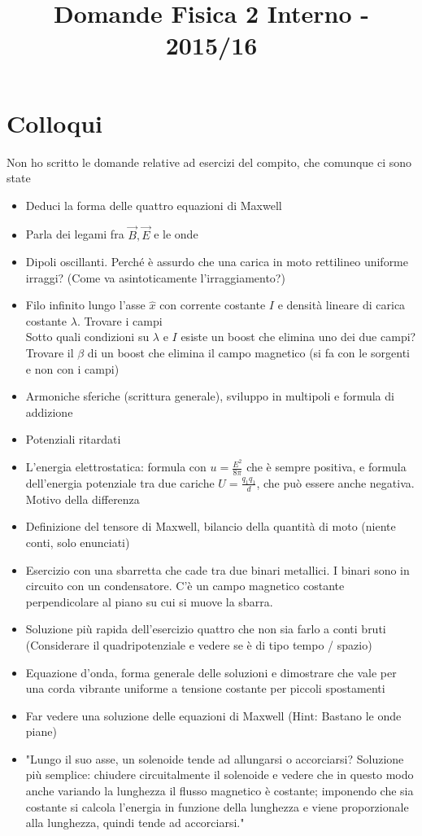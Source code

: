 \documentclass[a4paper,NoNotes,GeneralMath]{stdmdoc}
\begin{document}
	\title{Domande Fisica 2 Interno - 2015/16}
	
	\section*{Colloqui}
	Non ho scritto le domande relative ad esercizi del compito, che comunque ci sono state
	\begin{itemize}
		\item Deduci la forma delle quattro equazioni di Maxwell
		\item Parla dei legami fra $\vec{B}, \vec{E}$ e le onde
		\item Dipoli oscillanti. Perché è assurdo che una carica in moto rettilineo uniforme irraggi? (Come va asintoticamente l'irraggiamento?)
		\item Filo infinito lungo l'asse $\hat{x}$ con corrente costante $I$ e densità lineare di carica costante $\lambda$. Trovare i campi \\
			Sotto quali condizioni su $\lambda$ e $I$ esiste un boost che elimina uno dei due campi? Trovare il $\beta$ di un boost che elimina il campo magnetico (si fa con le sorgenti e non con i campi)
		\item Armoniche sferiche (scrittura generale), sviluppo in multipoli e formula di addizione
		\item Potenziali ritardati
		\item L'energia elettrostatica: formula con $u = \frac{E^2}{8\pi }$ che è sempre positiva, e formula dell'energia potenziale tra due cariche $U = \frac{q_1 q_1}{d}$, che può essere anche negativa. Motivo della differenza
		\item Definizione del tensore di Maxwell, bilancio della quantità di moto (niente conti, solo enunciati)
		\item Esercizio con una sbarretta che cade tra due binari metallici. I binari sono in circuito con un condensatore. C'è un campo magnetico costante perpendicolare al piano su cui si muove la sbarra.
		\item Soluzione più rapida dell'esercizio quattro che non sia farlo a conti bruti (Considerare il quadripotenziale e vedere se è di tipo tempo / spazio)
		\item Equazione d'onda, forma generale delle soluzioni e dimostrare che vale per una corda vibrante uniforme a tensione costante per piccoli spostamenti
		\item Far vedere una soluzione delle equazioni di Maxwell (Hint: Bastano le onde piane)
		\item "Lungo il suo asse, un solenoide tende ad allungarsi o accorciarsi? Soluzione più semplice: chiudere circuitalmente il solenoide e vedere che in questo modo anche variando la lunghezza il flusso magnetico è costante; imponendo che sia costante si calcola l’energia in funzione della lunghezza e viene proporzionale alla lunghezza, quindi tende ad accorciarsi."
	\end{itemize}
\end{document}
